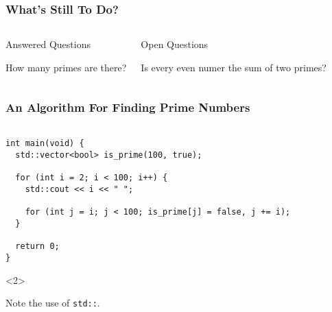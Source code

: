 \begin{frame}
  \frametitle{What's Still To Do?}


  \begin{columns}[t]


    \begin{block}{Answered Questions}

      How many primes are there?

    \end{block}




    \begin{block}{Open Questions}

      Is every even numer the sum of two primes?
      \cite{Goldbach1742}

    \end{block}

  \end{columns}

\end{frame}





\begin{frame}[fragile]
  \frametitle{An Algorithm For Finding Prime Numbers}


\begin{verbatim}

int main(void) {
  std::vector<bool> is_prime(100, true);

  for (int i = 2; i < 100; i++) {
    std::cout << i << " ";

    for (int j = i; j < 100; is_prime[j] = false, j += i);
  }

  return 0;
}

\end{verbatim}



  \begin{uncoverenv}<2>

    Note the use of \verb|std::|.

  \end{uncoverenv}

\end{frame}





